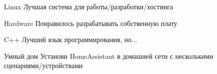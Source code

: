 



\begin{cvskills}

  \cvskill
    {Linux} %
    {Лучшая система для работы/разработки/хостинга} %

  \cvskill
    {Hardware} %
    {Понравилось разрабатывать собственную плату} %
    
  \cvskill
    {C++} %
    {Лучший язык программирования, но...} %
    
  \cvskill
    {Умный дом} %
    {Установи HomeAssistant в домашней сети с несколькими сценариями/устройствами} %

\end{cvskills}